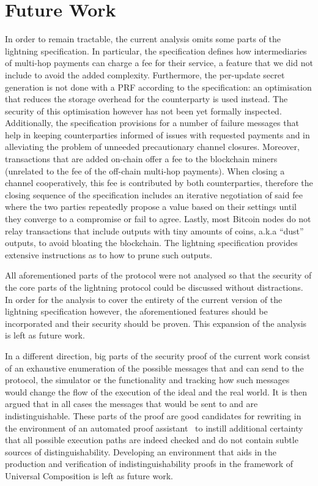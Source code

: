 \section{Future Work}
  In order to remain tractable, the current analysis omits some parts of the
  lightning specification. In particular, the specification defines how
  intermediaries of multi-hop payments can charge a fee for their service, a
  feature that we did not include to avoid the added complexity. Furthermore,
  the per-update secret generation is not done with a PRF according to the
  specification: an optimisation that reduces the storage overhead for the
  counterparty is used instead. The security of this optimisation however has
  not been yet formally inspected. Additionally, the specification provisions
  for a number of failure messages that help in keeping counterparties informed
  of issues with requested payments and in alleviating the problem of unneeded
  precautionary channel closures. Moreover, transactions that are added on-chain
  offer a fee to the blockchain miners (unrelated to the fee of the off-chain
  multi-hop payments). When closing a channel cooperatively, this fee is
  contributed by both counterparties, therefore the closing sequence of the
  specification includes an iterative negotiation of said fee where the two
  parties repeatedly propose a value based on their settings until they converge
  to a compromise or fail to agree. Lastly, most Bitcoin nodes do not relay
  transactions that include outputs with tiny amounts of coins, a.k.a ``dust''
  outputs, to avoid bloating the blockchain. The lightning specification
  provides extensive instructions as to how to prune such outputs.

  All aforementioned parts of the protocol were not analysed so that the
  security of the core parts of the lightning protocol could be discussed
  without distractions. In order for the analysis to cover the entirety of the
  current version of the lightning specification however, the aforementioned
  features should be incorporated and their security should be proven. This
  expansion of the analysis is left as future work.

  In a different direction, big parts of the security proof of the current work
  consist of an exhaustive enumeration of the possible messages that
  \environment{} and \adversary{} can send to the protocol, the simulator or the
  functionality and tracking how such messages would change the flow of the
  execution of the ideal and the real world. It is then argued that in all cases
  the messages that would be sent to \environment{} and \adversary{} are
  indistinguishable. These parts of the proof are good candidates for rewriting
  in the environment of an automated proof assistant~\cite{mccarthy} to instill
  additional certainty that all possible execution paths are indeed checked and
  do not contain subtle sources of distinguishability. Developing an environment
  that aids in the production and verification of indistinguishability proofs in
  the framework of Universal Composition is left as future work.

